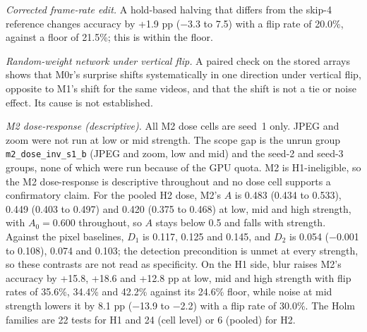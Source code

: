 \emph{Corrected frame-rate edit.} A hold-based halving that differs from the skip-4 reference changes accuracy by +1.9 pp ($-$3.3 to 7.5) with a flip rate of 20.0\%, against a floor of 21.5\%; this is within the floor.


\emph{Random-weight network under vertical flip.} A paired check on the stored arrays shows that M0r's surprise shifts systematically in one direction under vertical flip, opposite to M1's shift for the same videos, and that the shift is not a tie or noise effect. Its cause is not established.

\emph{M2 dose-response (descriptive).} All M2 dose cells are seed~1 only. JPEG and zoom were not run at low or mid strength. The scope gap is the unrun group \texttt{m2\_dose\_inv\_s1\_b} (JPEG and zoom, low and mid) and the seed-2 and seed-3 groups, none of which were run because of the GPU quota. M2 is H1-ineligible, so the M2 dose-response is descriptive throughout and no dose cell supports a confirmatory claim. For the pooled H2 dose, M2's $A$ is 0.483 (0.434 to 0.533), 0.449 (0.403 to 0.497) and 0.420 (0.375 to 0.468) at low, mid and high strength, with $A_0=$0.600 throughout, so $A$ stays below 0.5 and falls with strength. Against the pixel baselines, $D_1$ is 0.117, 0.125 and 0.145, and $D_2$ is 0.054 ($-$0.001 to 0.108), 0.074 and 0.103; the detection precondition is unmet at every strength, so these contrasts are not read as specificity. On the H1 side, blur raises M2's accuracy by +15.8, +18.6 and +12.8 pp at low, mid and high strength with flip rates of 35.6\%, 34.4\% and 42.2\% against its 24.6\% floor, while noise at mid strength lowers it by 8.1 pp ($-$13.9 to $-$2.2) with a flip rate of 30.0\%. The Holm families are 22 tests for H1 and 24 (cell level) or 6 (pooled) for H2.

